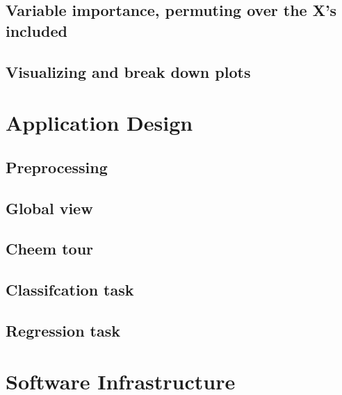 \documentclass[
]{article}
\begin{document}
\hypertarget{variable-importance-permuting-over-the-xs-included}{%
\subsection{Variable importance, permuting over the X's included}\label{variable-importance-permuting-over-the-xs-included}}

\hypertarget{visualizing-and-break-down-plots}{%
\subsection{Visualizing and break down plots}\label{visualizing-and-break-down-plots}}

\hypertarget{sec:applicationdesign}{%
\section{Application Design}\label{sec:applicationdesign}}

\hypertarget{preprocessing}{%
\subsection{Preprocessing}\label{preprocessing}}

\hypertarget{global-view}{%
\subsection{Global view}\label{global-view}}

\hypertarget{cheem-tour}{%
\subsection{Cheem tour}\label{cheem-tour}}

\hypertarget{classifcation-task}{%
\subsection{Classifcation task}\label{classifcation-task}}

\hypertarget{regression-task}{%
\subsection{Regression task}\label{regression-task}}

\hypertarget{sec:softwareinfrastructure}{%
\section{Software Infrastructure}\label{sec:softwareinfrastructure}}
\end{document}
